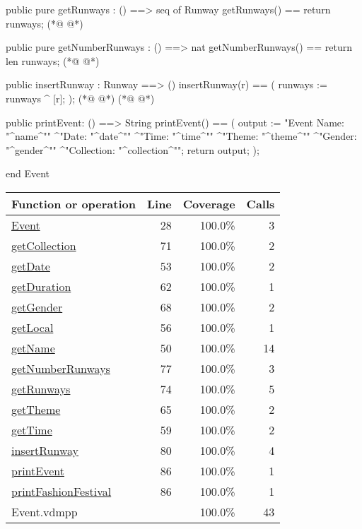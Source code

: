 \begin{vdmpp}[breaklines=true]
  public pure getRunways : () ==> seq of Runway
     getRunways() == return runways;
(*@
\label{getNumberRunways:77}
@*)
 
  public pure getNumberRunways : () ==> nat
     getNumberRunways() == return len runways;
(*@
\label{insertRunway:80}
@*)
     
  public insertRunway : Runway ==> ()
   insertRunway(r) ==
   (
     runways := runways ^  [r];
   );
(*@
\label{printFashionFestival:86}
@*)
(*@
\label{printEvent:86}
@*)
  
  public printEvent: () ==> String
  printEvent() == (
  output := "Event Name: "^name^"\n"
       ^"Date: "^date^"\n"
       ^"Time: "^time^"\n"
       ^"Theme: "^theme^"\n"
       ^"Gender: "^gender^"\n"
       ^"Collection: "^collection^"\n";
  return output;
  );
  
end Event
\end{vdmpp}
\bigskip
\begin{longtable}{|l|r|r|r|}
\hline
Function or operation & Line & Coverage & Calls \\
\hline
\hline
\hyperref[Event:28]{Event} & 28&100.0\% & 3 \\
\hline
\hyperref[getCollection:71]{getCollection} & 71&100.0\% & 2 \\
\hline
\hyperref[getDate:53]{getDate} & 53&100.0\% & 2 \\
\hline
\hyperref[getDuration:62]{getDuration} & 62&100.0\% & 1 \\
\hline
\hyperref[getGender:68]{getGender} & 68&100.0\% & 2 \\
\hline
\hyperref[getLocal:56]{getLocal} & 56&100.0\% & 1 \\
\hline
\hyperref[getName:50]{getName} & 50&100.0\% & 14 \\
\hline
\hyperref[getNumberRunways:77]{getNumberRunways} & 77&100.0\% & 3 \\
\hline
\hyperref[getRunways:74]{getRunways} & 74&100.0\% & 5 \\
\hline
\hyperref[getTheme:65]{getTheme} & 65&100.0\% & 2 \\
\hline
\hyperref[getTime:59]{getTime} & 59&100.0\% & 2 \\
\hline
\hyperref[insertRunway:80]{insertRunway} & 80&100.0\% & 4 \\
\hline
\hyperref[printEvent:86]{printEvent} & 86&100.0\% & 1 \\
\hline
\hyperref[printFashionFestival:86]{printFashionFestival} & 86&100.0\% & 1 \\
\hline
\hline
Event.vdmpp & & 100.0\% & 43 \\
\hline
\end{longtable}

